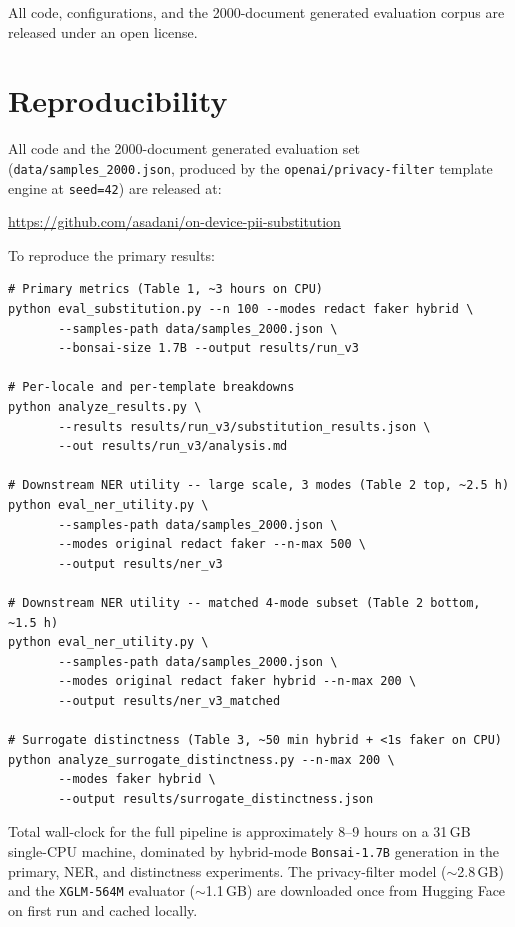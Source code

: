 \documentclass[11pt]{article}
\newcommand{\code}[1]{\texttt{#1}}
\newcommand{\openaipf}{\code{openai/privacy-filter}}
\newcommand{\bonsai}{\code{Bonsai-1.7B}}
\newcommand{\xglm}{\code{XGLM-564M}}
\begin{document}
All code, configurations, and the 2000-document generated evaluation
corpus are released under an open license.

\section*{Reproducibility}
\label{sec:repro}

All code and the 2000-document generated evaluation set
(\code{data/samples\_2000.json}, produced by the \openaipf{}
template engine at \texttt{seed=42}) are released
at:%
\begin{center}
\url{https://github.com/asadani/on-device-pii-substitution}
\end{center}
To reproduce the primary results:

\begin{lstlisting}
# Primary metrics (Table 1, ~3 hours on CPU)
python eval_substitution.py --n 100 --modes redact faker hybrid \
       --samples-path data/samples_2000.json \
       --bonsai-size 1.7B --output results/run_v3

# Per-locale and per-template breakdowns
python analyze_results.py \
       --results results/run_v3/substitution_results.json \
       --out results/run_v3/analysis.md

# Downstream NER utility -- large scale, 3 modes (Table 2 top, ~2.5 h)
python eval_ner_utility.py \
       --samples-path data/samples_2000.json \
       --modes original redact faker --n-max 500 \
       --output results/ner_v3

# Downstream NER utility -- matched 4-mode subset (Table 2 bottom, ~1.5 h)
python eval_ner_utility.py \
       --samples-path data/samples_2000.json \
       --modes original redact faker hybrid --n-max 200 \
       --output results/ner_v3_matched

# Surrogate distinctness (Table 3, ~50 min hybrid + <1s faker on CPU)
python analyze_surrogate_distinctness.py --n-max 200 \
       --modes faker hybrid \
       --output results/surrogate_distinctness.json
\end{lstlisting}

Total wall-clock for the full pipeline is approximately 8--9 hours on
a 31\,GB single-CPU machine, dominated by hybrid-mode \bonsai{}
generation in the primary, NER, and distinctness experiments. The
privacy-filter model ($\sim$2.8\,GB) and the \xglm{} evaluator
($\sim$1.1\,GB) are downloaded once from Hugging Face on first run
and cached locally.
\end{document}
